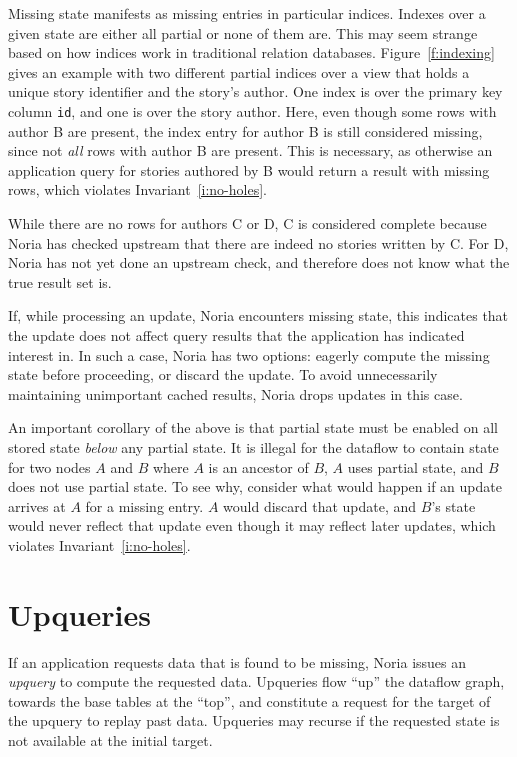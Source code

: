 Missing state manifests as missing entries in particular indices. Indexes over a
given state are either all partial or none of them are. This may seem strange
based on how indices work in traditional relation databases.
Figure~\vref{f:indexing} gives an example with two different partial indices
over a view that holds a unique story identifier and the story's author. One
index is over the primary key column \texttt{id}, and one is over the story
author. Here, even though some rows with author B are present, the index entry
for author B is still considered missing, since not \emph{all} rows with author
B are present. This is necessary, as otherwise an application query for stories
authored by B would return a result with missing rows, which violates
Invariant~\ref{i:no-holes}.

While there are no rows for authors C or D, C is considered complete because
Noria has checked upstream that there are indeed no stories written by C. For D,
Noria has not yet done an upstream check, and therefore does not know what the
true result set is.

If, while processing an update, Noria encounters missing state, this indicates
that the update does not affect query results that the application has indicated
interest in. In such a case, Noria has two options: eagerly compute the missing
state before proceeding, or discard the update. To avoid unnecessarily
maintaining unimportant cached results, Noria drops updates in this case.

An important corollary of the above is that partial state must be enabled
on all stored state \emph{below} any partial state. It is illegal for the
dataflow to contain state for two nodes $A$ and $B$ where $A$ is an ancestor of
$B$, $A$ uses partial state, and $B$ does not use partial state. To see why,
consider what would happen if an update arrives at $A$ for a missing entry. $A$
would discard that update, and $B$'s state would never reflect that update even
though it may reflect later updates, which violates
Invariant~\ref{i:no-holes}.

\section{Upqueries}
\label{s:upqueries}

If an application requests data that is found to be missing, Noria issues an
\textit{upquery} to compute the requested data. Upqueries flow ``up'' the
dataflow graph, towards the base tables at the ``top'', and constitute a request
for the target of the upquery to replay past data. Upqueries may recurse if the
requested state is not available at the initial target.


